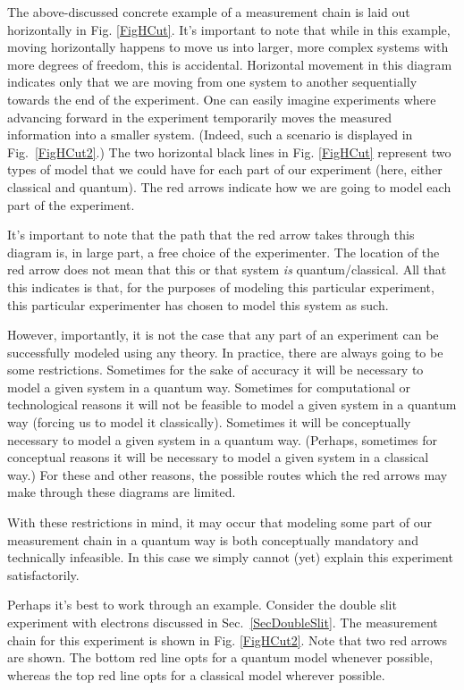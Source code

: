 \documentclass[12pt,prd,superscriptaddress,floatfix,amsmath,amssymb,amsfonts,nofootinbib]{revtex4-2}
\begin{document}
The above-discussed concrete example of a measurement chain is laid out horizontally in Fig. \ref{FigHCut}. It's important to note that while in this example, moving horizontally happens to move us into larger, more complex systems with more degrees of freedom, this is accidental. Horizontal movement in this diagram indicates only that we are moving from one system to another sequentially towards the end of the experiment. One can easily imagine experiments where advancing forward in the experiment temporarily moves the measured information into a smaller system. (Indeed, such a scenario is displayed in Fig.~\ref{FigHCut2}.) The two horizontal black lines in Fig. \ref{FigHCut} represent two types of model that we could have for each part of our experiment (here, either classical and quantum). The red arrows indicate how we are going to model each part of the experiment. 

It's important to note that the path that the red arrow takes through this diagram is, in large part, a free choice of the experimenter. The location of the red arrow does not mean that this or that system \textit{is} quantum/classical. All that this indicates is that, for the purposes of modeling this particular experiment, this particular experimenter has chosen to model this system as such.

However, importantly, it is not the case that any part of an experiment can be successfully modeled using any theory. In practice, there are always going to be some restrictions. Sometimes for the sake of accuracy it will be necessary to model a given system in a quantum way. Sometimes for computational or technological reasons it will not be feasible to model a given system in a quantum way (forcing us to model it classically). Sometimes it will be conceptually necessary to model a given system in a quantum way. (Perhaps, sometimes for conceptual reasons it will be necessary to model a given system in a classical way.) For these and other reasons, the possible routes which the red arrows may make through these diagrams are limited.

With these restrictions in mind, it may occur that modeling some part of our measurement chain in a quantum way is both conceptually mandatory and technically infeasible. In this case we simply cannot (yet) explain this experiment satisfactorily.

Perhaps it's best to work through an example. Consider the double slit experiment with electrons discussed in Sec.~\ref{SecDoubleSlit}. The measurement chain for this experiment is shown in Fig. \ref{FigHCut2}. Note that two red arrows are shown. The bottom red line opts for a quantum model whenever possible, whereas the top red line opts for a classical model wherever possible.
\end{document}
